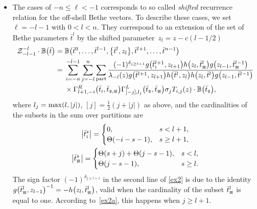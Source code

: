 \documentclass[pdftex]{sigma}
\newcommand{\so}{\scriptscriptstyle \rm I}
\newcommand{\st}{\scriptscriptstyle \rm I\hspace{-1pt}I}
\newcommand{\sth}{\scriptscriptstyle \rm I\hspace{-1pt}I\hspace{-1pt}I}
\newcommand{\bt}{{\bar t}}
\theoremstyle{definition}
\def\BB{{\mathbb{B}}}
\def\r#1{\eqref{#1}}
\def\Z{\mathcal{Z}}
\def\Gml{\Gamma^L}
\def\Gmr{\Gamma^R}
\begin{document}
\begin{itemize}
which coincides with the
recurrence relation (3.16) from the paper \cite{LP2}.
\item The cases of $-n\leq \ell<-1$ corresponds to so called {\it shifted}
 recurrence
relation for the off-shell Bethe vectors.
To describe these cases, we set
$\ell=-l-1$ with $0<l<n$. They correspond to an extension of the set of Bethe
parameters $\bt^l$ by the shifted parameter~${z_l=z-c(l-1/2)}$
\begin{align}
\Z^{-l}_{-l-1}\cdot\BB\bigl(\bt\bigr)={}&
\BB\bigl(\bt^0,\dots,\bt^{l-1},\bigl\{\bt^{l},z_{l}\bigr\},\bt^{l+1},\dots,\bt^{n-1}\bigr)\nonumber\\
={}&\sum_{i=-n}^{-l-1}\sum_{j=-l}^n\sum_{\rm part}
\frac{(-1)^{\delta_{j\geq l+1}}
g\bigl(\bt^{l+1}_{\so},z_{l+1}\bigr) h\bigl(z_l,\bt^{l}_{\sth}\bigr) g\bigl(z_{l-1},\bt^{l-1}_{\sth}\bigr)}
{\lambda_{-l}(z) g\bigl(\bt^{l+1},z_{l+1}\bigr) h\bigl(\bt^{l},z_{l}\bigr) h\bigl(z_l,\bt^{l}\bigr)
g\bigl(z_{l-1},\bt^{l-1}\bigr)}\nonumber\\
&\times \Gmr_{l+1,-i}\bigl(\bt_{\so},\bt_{{\st},{\sth}}\bigr)
\Gml_{[-j],l_j}\bigl(\bt_{\st},\bt_{{\sth}}\bigr)\sigma_{j}
T_{i,j}(z)\cdot \BB\bigl(\bt_{\st}\bigr) ,\label{ex2}
\end{align}
where $l_j={\rm max}(l,|j|)$, $[j]=\frac12(j+|j|)$ as above, and the
 cardinalities of the subsets in the sum over partitions are
\begin{gather}
\big|\bt^s_{\so}\big|=\begin{cases}
0, &s<l+1,\\
\Theta(-i-s-1), &s\geq l+1,
\end{cases}\nonumber\\
\big|\bt^s_{\sth}\big|=\begin{cases}
\Theta(s+j)+\Theta(j-s-1), &s<l,\\
\Theta(j-s-1), &s\geq l.
\end{cases}\label{ex2a}
\end{gather}
The sign factor $(-1)^{\delta_{j\geq l+1}}$ in the second line of
\r{ex2} is due to the identity
 $g\bigl(\bt^l_{\sth},z_{l-1}\bigr)^{-1}=-h\bigl(z_{l},\bt^l_{\sth}\bigr)$, valid when the cardinality of the subset
$\bt^l_{\sth}$ is equal to one. According to~\r{ex2a}, this happens
when $j\geq l+1$.


\end{itemize}
\end{document}
